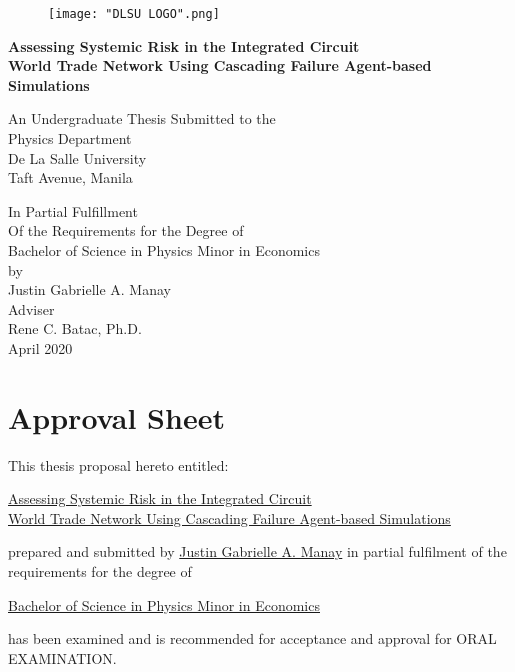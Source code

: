 \documentclass[12pt,letterpaper]{report}
\begin{document}
\begin{titlepage}
\begin{center}
	\begin{figure}
	\centering
	\texttt{[image: "DLSU LOGO".png]}	
	\end{figure}
	\vspace*{0.25cm}
	\large
	\textbf{Assessing Systemic Risk in the Integrated Circuit \\
	World Trade Network Using Cascading Failure Agent-based Simulations}
	
	\vspace{1cm}
	\normalsize
	An Undergraduate Thesis Submitted to the\\Physics Department\\De La Salle University\\Taft Avenue, Manila
	
	\vspace{1cm}
	\normalsize
	In Partial Fulfillment\\Of the Requirements for the Degree of\\Bachelor of Science in Physics Minor in Economics\\
	\vspace{1cm}
	\normalsize
	by\\
	Justin Gabrielle A. Manay\\
	\vspace{0.5cm}
	\normalsize
	Adviser\\
	Rene C. Batac, Ph.D.\\
	\vspace{0.5cm}
	\normalsize
	April 2020
	\vfill
\end{center}
\end{titlepage}

\section*{\centering Approval Sheet}
\begin{flushleft}
	This thesis proposal hereto entitled:
\end{flushleft}
\begin{center}
	\underline{ \hspace{0.43in}Assessing Systemic Risk in the Integrated Circuit
	\hspace{0.41in}} \\
	\vspace{0.5cm}
	\underline{\hspace{0.15in}World Trade Network Using Cascading Failure Agent-based Simulations \hspace{0.10in}}
\end{center}
prepared and submitted by \underline{Justin Gabrielle A. Manay} in partial fulfilment of the requirements for the degree of
	\begin{center}
		\underline{\hspace{0.5in} Bachelor of Science in Physics Minor in Economics \hspace{0.5in}}
	\end{center} 
has been examined and is recommended for acceptance and approval for ORAL EXAMINATION. 
\end{document}
